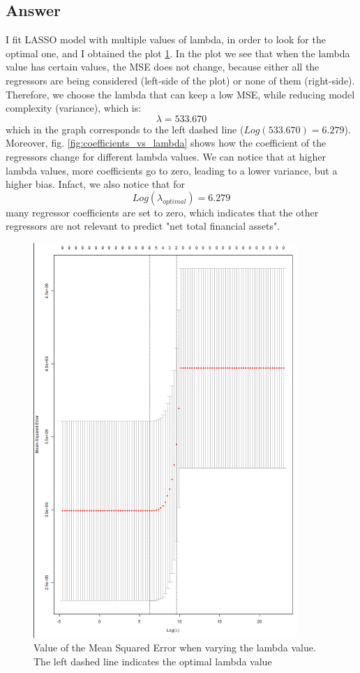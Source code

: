 \documentclass{article}
\begin{document}
	\subsection{Answer}
	I fit LASSO model with multiple values of lambda, in order to look for the optimal one, and I obtained the plot \ref{fig:MSE_vs_lambda}. In the plot we see that when the lambda value has certain values, the MSE does not change, because either all the regressors are being considered (left-side of the plot) or none of them (right-side). Therefore, we choose the lambda that can keep a low MSE, while reducing model complexity (variance), which is:
	$$\lambda =  533.670$$
	which in the graph corresponds to the left dashed line ($Log(533.670)=6.279$).
	Moreover, fig. \ref{fig:coefficients_vs_lambda} shows how the coefficient of the regressors change for different lambda values. We can notice that at higher lambda values, more coefficients go to zero, leading to a lower variance, but a higher bias. Infact, we 
	also notice that for $$Log(\lambda_{optimal}) = 6.279$$ many regressor coefficients are set to zero, which indicates that the other regressors are not relevant to predict "net total financial assets".
	\begin{figure}[H]\centering
		\includegraphics[width=10cm]{MSE_vs_lambda}
		\caption{Value of the Mean Squared Error when varying the lambda value. The left dashed line indicates the optimal lambda value}
		\label{fig:MSE_vs_lambda}
	\end{figure}
\end{document}
